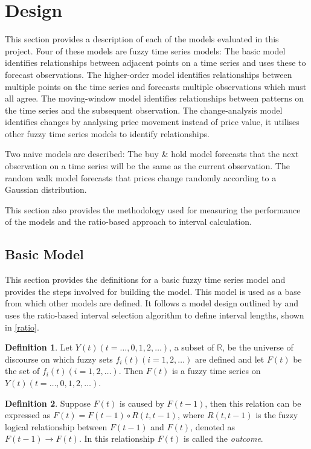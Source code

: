 \documentclass[12pt, oneside, a4paper]{article}
\theoremstyle{definition}
\newtheorem{ftsdef}{Definition}
\begin{document}
\section{Design}

\label{design}

This section provides a description of each of the models evaluated in this project. Four of these models are fuzzy time series models: The basic model identifies relationships between adjacent points on a time series and uses these to forecast observations. The higher-order model identifies relationships between multiple points on the time series and forecasts multiple observations which must all agree. The moving-window model identifies relationships between patterns on the time series and the subsequent observation. The change-analysis model identifies changes by analysing price movement instead of price value, it utilises other fuzzy time series models to identify relationships. 

Two naive models are described: The buy \& hold model forecasts that the next observation on a time series will be the same as the current observation. The random walk model forecasts that prices change randomly according to a Gaussian distribution. 

This section also provides the methodology used for measuring the performance of the models and the ratio-based approach to interval calculation.

\subsection{Basic Model}
\label{fts-design}
This section provides the definitions for a basic fuzzy time series model and provides the steps involved for building the model. This model is used as a base from which other models are defined. It follows a model design outlined by \cite{chen1996forecasting} and uses the ratio-based interval selection algorithm to define interval lengths, shown in \cref{ratio}.

\begin{ftsdef}
\label{def1}
Let $Y(t)(t= \ldots,0,1,2, \ldots)$, a subset of $\mathbb{R}$, be the universe of discourse on which fuzzy sets $f_i(t)(i=1,2,\ldots)$ are defined and let $F(t)$ be the set of $f_i(t)(i=1,2,\ldots)$. Then $F(t)$ is a fuzzy time series on $Y(t)(t= \ldots,0,1,2, \ldots)$.
\end{ftsdef}

\begin{ftsdef}
\label{def2}
Suppose $F(t)$ is caused by $F(t-1)$, then this relation can be expressed as $F(t)=F(t-1) \circ R(t,t-1)$, where $R(t,t-1)$ is the fuzzy logical relationship between $F(t-1)$ and $F(t)$, denoted as $F(t-1) \rightarrow F(t)$. In this relationship $F(t)$ is called the \textit{outcome}.
\end{ftsdef}
\end{document}
